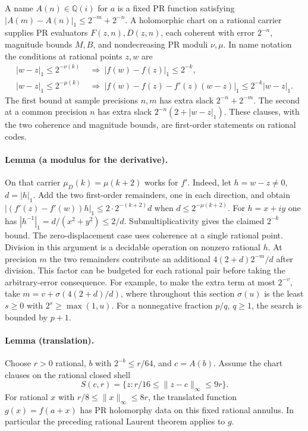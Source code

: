 A name $A(n)\in\mathbb Q(i)$ for $a$ is a fixed PR function satisfying
$|A(m)-A(n)|_1\le 2^{-m}+2^{-n}$. A holomorphic chart on a rational
carrier supplies PR evaluators $F(z,n),D(z,n)$, each coherent with
error $2^{-n}$, magnitude bounds $M,B$, and nondecreasing PR moduli
$\nu,\mu$. In name notation the conditions at rational points $z,w$ are
\begin{align*}
 |w-z|_1\le 2^{-\nu(k)}
   &\ \Longrightarrow\ |f(w)-f(z)|_1\le 2^{-k},\\
 |w-z|_1\le 2^{-\mu(k)}
   &\ \Longrightarrow\ |f(w)-f(z)-f'(z)(w-z)|_1
                      \le 2^{-k}|w-z|_1 .
\end{align*}
The first bound at sample precisions $n,m$ has extra slack $2^{-n}+2^{-m}$.
The second at a common precision $n$ has extra slack
$2^{-n}(2+|w-z|_1)$. These clauses, with the two coherence and magnitude
bounds, are first-order statements on rational codes.

\paragraph{Lemma (a modulus for the derivative).}
On that carrier $\mu_D(k)=\mu(k+2)$ works for $f'$. Indeed, let
$h=w-z\ne0$, $d=|h|_1$. Add the two first-order remainders, one in
each direction, and obtain
$|(f'(z)-f'(w))h|_1\le 2\cdot 2^{-(k+2)}d$ when
$d\le 2^{-\mu(k+2)}$. For $h=x+iy$ one has
$|h^{-1}|_1=d/(x^2+y^2)\le 2/d$. Submultiplicativity gives the
claimed $2^{-k}$ bound. The zero-displacement case uses coherence at a
single rational point. Division in this argument is a decidable
operation on nonzero rational $h$. At precision $m$ the two remainders
contribute an additional $4(2+d)2^{-m}/d$ after division. This factor
can be budgeted for each rational pair before taking the arbitrary-error
consequence. For example, to make the extra term at most $2^{-v}$, take
$m=v+\sigma(4(2+d)/d)$, where throughout this section
$\sigma(u)$ is the least $s\ge0$ with $2^s\ge\max(1,u)$.
For a nonnegative fraction $p/q$, $q\ge1$, the search is bounded by $p+1$.

\paragraph{Lemma (translation).}
Choose $r>0$ rational, $b$ with $2^{-b}\le r/64$, and
$c=A(b)$. Assume the chart clauses on the rational closed shell
\[
 S(c,r)=\{z:r/16\le\lVert z-c\rVert_\infty\le 9r\}.
\]
For rational $x$ with $r/8\le\lVert x\rVert_\infty\le8r$, the
translated function $g(x)=f(a+x)$ has PR holomorphy data on this
fixed rational annulus. In particular the preceding rational Laurent
theorem applies to $g$.

